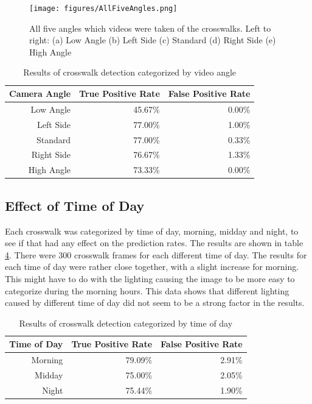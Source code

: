\begin{figure}[t]
\begin{center}
\texttt{[image: figures/AllFiveAngles.png]}
\captionfonts
\caption{All five angles which videos were taken of the crosswalks. Left to right: (a) Low Angle (b) Left Side (c) Standard (d) Right Side (e) High Angle}
\label{fig:AllFiveAngles}
\end{center}
\end{figure}

\begin{table}[t]
    \begin{longtable}{|r|r|r|}
    \caption{Results of crosswalk detection categorized by video angle}
    \label{tab:downbad}\\

    \hline
    Camera Angle & True Positive Rate & False Positive Rate \bigstrut\\
    \hline
    Low Angle & 45.67\% & 0.00\% \bigstrut\\
    \hline
    Left Side & 77.00\% & 1.00\% \bigstrut\\
    \hline
    Standard & 77.00\% & 0.33\% \bigstrut\\
    \hline
    Right Side & 76.67\% & 1.33\% \bigstrut\\
    \hline
    High Angle & 73.33\% & 0.00\% \bigstrut\\
    \hline
    \end{longtable}
\end{table}

\clearpage

\subsection{Effect of Time of Day}
Each crosswalk was categorized by time of day, morning, midday and night, to see if that had any effect on the prediction rates. The results are shown in table \ref{tab:timeofday}. There were 300 crosswalk frames for each different time of day. The results for each time of day were rather close together, with a slight increase for morning. This might have to do with the lighting causing the image to be more easy to categorize during the morning hours. This data shows that different lighting caused by different time of day did not seem to be a strong factor in the results.

\begin{table}[t]
    \begin{longtable}{|r|r|r|}
    \caption{Results of crosswalk detection categorized by time of day}
    \label{tab:timeofday}\\ 
    \hline
    Time of Day & True Positive Rate & False Positive Rate \bigstrut\\
    \hline
    Morning & 79.09\% & 2.91\% \bigstrut\\
    \hline
    Midday & 75.00\% & 2.05\% \bigstrut\\
    \hline
    Night & 75.44\% & 1.90\% \bigstrut\\
    \hline
    \end{longtable}
\end{table}

